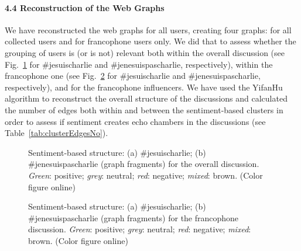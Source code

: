 \paragraph{4.4 Reconstruction of the Web Graphs} We have reconstructed the web graphs for all users, creating four graphs: for all collected users and for francophone users only. We did that to assess whether the grouping of users is (or is not) relevant both within the overall discussion (see Fig.~\cref{fig:overallSentimentStructure} for \#jesuischarlie and \#jenesuispascharlie, respectively), within the francophone one (see Fig.~\cref{fig:francophoneSentimentStructure} for \#jesuischarlie and \#jenesuispascharlie, respectively), and for the francophone influencers. We have used the YifanHu algorithm to reconstruct the overall structure of the discussions and calculated the number of edges both within and between the sentiment-based clusters in order to assess if sentiment creates echo chambers in the discussions (see Table~\cref{tab:clusterEdgesNo}).

\begin{figure}[ht]
	\caption{Sentiment-based structure: (a) \#jesuischarlie; (b) \#jenesuispascharlie (graph fragments) for the overall discussion. \textit{Green}: positive; \textit{grey}: neutral; \textit{red}: negative; \textit{mixed}: brown. (Color figure online)}\label{fig:overallSentimentStructure}
\end{figure}

\begin{figure}[ht]
	\caption{Sentiment-based structure: (a) \#jesuischarlie; (b) \#jenesuispascharlie (graph fragments) for the francophone discussion. \textit{Green}: positive; \textit{grey}: neutral; \textit{red}: negative; \textit{mixed}: brown. (Color figure online)}\label{fig:francophoneSentimentStructure}
\end{figure}


